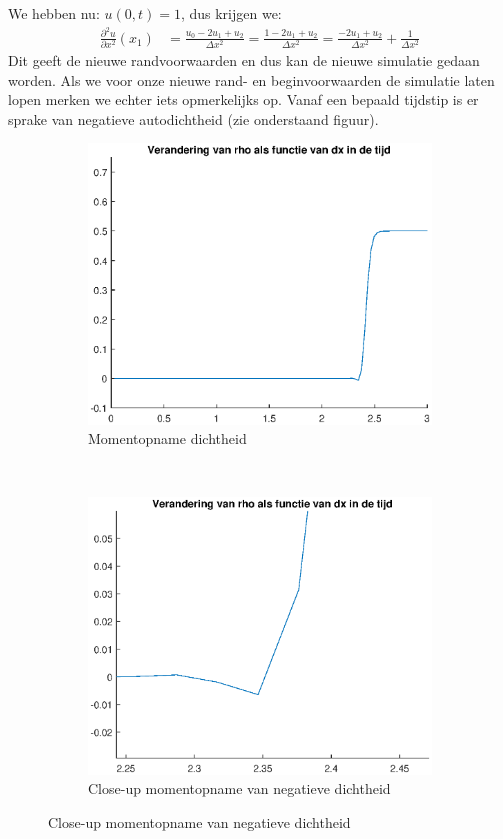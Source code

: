 \documentclass{article}
\begin{document}
We hebben nu: $u(0,t) = 1$, dus krijgen we:
\begin{align*}
\frac{\partial^2 u}{\partial x^2}(x_1) &= \frac{u_{0}-2u_1+u_{2}}{\Delta x^2}
= \frac{1-2u_1+u_{2}}{\Delta x^2}
= \frac{-2u_1+u_{2}}{\Delta x^2} +\frac{1}{\Delta x^2}
\end{align*}
Dit geeft de nieuwe randvoorwaarden en dus kan de nieuwe simulatie gedaan worden.
Als we voor onze nieuwe rand- en beginvoorwaarden de simulatie laten lopen merken we echter iets opmerkelijks op.
Vanaf een bepaald tijdstip is er sprake van negatieve autodichtheid (zie onderstaand figuur).
\begin{figure}[H]
\begin{subfigure}{0.45\textwidth}
\includegraphics[scale=0.5]{6gek.eps}
\caption{Momentopname dichtheid}
\end{subfigure}
~
\begin{subfigure}{0.45\textwidth}
\includegraphics[scale=0.5]{6gekc.eps}
\caption{Close-up momentopname van negatieve dichtheid}
\end{subfigure}
\end{figure}
\end{document}
